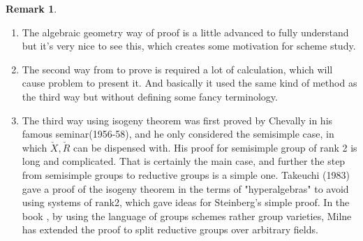 \documentclass[12pt,a4paper,english]{article}
\theoremstyle{plain}
\theoremstyle{definition}
\newtheorem*{rem}{Remark}
\begin{document}
\begin{rem}
\begin{enumerate}
    \item The algebraic geometry way of proof is a little advanced to fully understand but it's very nice to see this, which creates some motivation for scheme study.
    \item The second way from \cite{springer1994linear} to prove is required a lot of calculation, which will cause problem to present it. And basically it used the same kind of method as the third way but without defining some fancy terminology.
    \item The third way using isogeny theorem was first proved by Chevally in his famous seminar(1956-58), and he only considered the semisimple case, in which $\check{X}, \check{R}$ can be dispensed with. His proof for semisimple group of rank 2 is long and complicated. That is certainly the main case, and further the step from semisimple groups to reductive groups is a simple one. Takeuchi (1983) gave a proof of the isogeny theorem in the terms of "hyperalgebras" to avoid using systems of rank2, which gave ideas for Steinberg's simple proof. In the book \cite{milneiAG}, by using the language of groups schemes rather group varieties, Milne has extended the proof to split reductive groups over arbitrary fields.
    

\end{enumerate}

\end{rem}





\newpage


\end{document}
